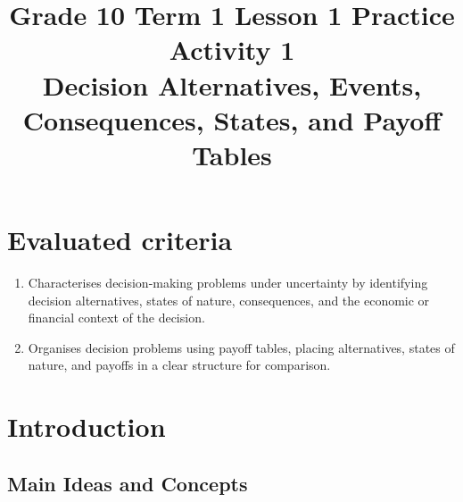 \makeatletter
{}
\makeatother



\title{Grade 10 Term 1 Lesson 1 Practice Activity 1\\Decision Alternatives, Events, Consequences, States, and Payoff Tables}
\author{}
\date{}


	\maketitle

	\setcounter{tocdepth}{1}
	\setcounter{secnumdepth}{2}
	\label{toc}
	\tableofcontents

	\section*{Evaluated criteria}
	\begin{enumerate}[label=\textbf{C\arabic*}]
		\item Characterises decision-making problems under uncertainty by identifying decision alternatives, states of nature, consequences, and the economic or financial context of the decision.
		\item Organises decision problems using payoff tables, placing alternatives, states of nature, and payoffs in a clear structure for comparison.
	\end{enumerate}

	\section{Introduction} 
	\label{sec:introduction} 
	
	\vspace{5mm} 
	
	\subsection{Main Ideas and Concepts}
	\label{sec:main-ideas-and-concepts}
	
